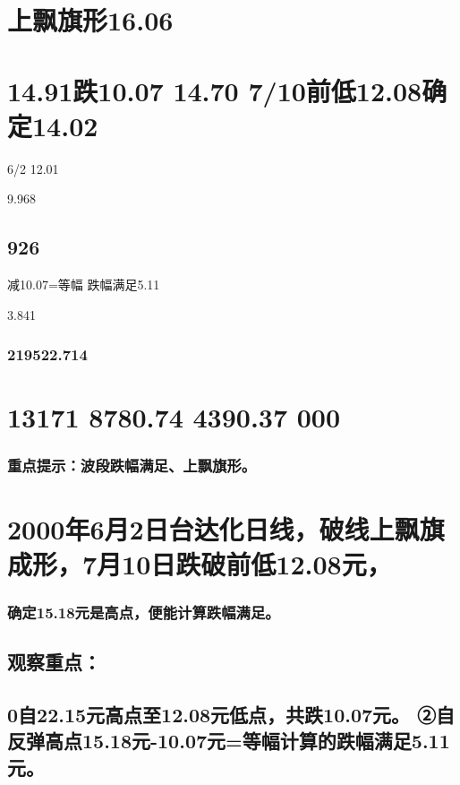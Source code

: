 \documentclass{article}
\begin{document}
\section{上飘旗形16.06}

\section{14.91跌10.07 14.70 7/10前低12.08确定14.02}

6/2 12.01

9.968

\subsection{926}

减10.07=等幅 跌幅满足5.11

3.841

\subsubsection{219522.714}

\section{13171 8780.74 4390.37 000}

\subsubsection{重点提示：波段跌幅满足、上飘旗形。}

\section{2000年6月2日台达化日线，破线上飘旗成形，7月10日跌破前低12.08元，}

\subsubsection{确定15.18元是高点，便能计算跌幅满足。}

\subsection{观察重点：}

\subsection{0自22.15元高点至12.08元低点，共跌10.07元。 ②自反弹高点15.18元-10.07元=等幅计算的跌幅满足5.11元。}
\end{document}
